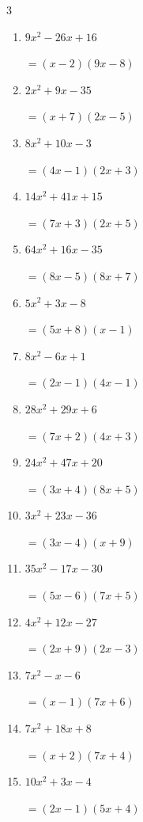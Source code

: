 \begin{multicols}{3}
\begin{enumerate}
        $=(9x+1)(x+5)$

  \item $9x^{2}-26x+16$

        $=(x-2)(9x-8)$

  \item $2x^{2}+9x-35$

        $=(x+7)(2x-5)$

  \item $8x^{2}+10x-3$

        $=(4x-1)(2x+3)$

  \item $14x^{2}+41x+15$

        $=(7x+3)(2x+5)$

  \item $64x^{2}+16x-35$

        $=(8x-5)(8x+7)$

\columnbreak %

  \item $5x^{2}+3x-8$

        $=(5x+8)(x-1)$

  \item $8x^{2}-6x+1$

        $=(2x-1)(4x-1)$

  \item $28x^{2}+29x+6$

        $=(7x+2)(4x+3)$

  \item $24x^{2}+47x+20$

        $=(3x+4)(8x+5)$

  \item $3x^{2}+23x-36$

        $=(3x-4)(x+9)$

  \item $35x^{2}-17x-30$

        $=(5x-6)(7x+5)$

  \item $4x^{2}+12x-27$

        $=(2x+9)(2x-3)$

  \item $7x^{2}-x-6$

        $=(x-1)(7x+6)$

  \item $7x^{2}+18x+8$

        $=(x+2)(7x+4)$

  \item $10x^{2}+3x-4$

        $=(2x-1)(5x+4)$


\end{enumerate}
\end{multicols}
